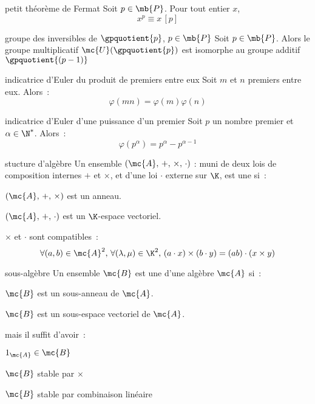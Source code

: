 \begin{adjustwidth}{-3cm}{-3cm}
\begin{theoreme}{2.51}{petit théorème de Fermat}
    Soit $p \in \mb{P}$. Pour tout entier $x$, $$x^p \equiv x \,[p]$$
\end{theoreme}

\begin{theoreme}{2.52}{groupe des inversibles de $\gpquotient{p}$, $p \in \mb{P}$}
    Soit $p \in \mb{P}$. Alors le groupe multiplicatif $\mc{U}(\gpquotient{p})$ est isomorphe au groupe additif $\gpquotient{(p-1)}$
\end{theoreme}

\begin{proposition}{2.54}{indicatrice d'Euler du produit de premiers entre eux}
    Soit $m$ et $n$ premiers entre eux. Alors~:
    $$\varphi(mn) = \varphi(m)\varphi(n)$$
\end{proposition}

\begin{proposition}{2.55}{indicatrice d'Euler d'une puissance d'un premier}
    Soit $p$ un nombre premier et $\alpha \in \N^*$. Alors~:
    $$\varphi(p^\alpha) = p^\alpha - p^{\alpha -1}$$
\end{proposition}

\begin{definition}{2.72}{stucture d'algèbre}
    Un ensemble $(\mc{A},\, +,\, \times,\, \cdot)$ :  muni de deux lois de composition internes $+$ et $\times$, et d’une loi $\cdot$ externe sur $\K$, est une  si~:
    \begin{enumeratebf}
        \item $(\mc{A},\, +,\, \times)$ est un anneau.
        \item $(\mc{A},\, +,\, \cdot)$ est un $\K$-espace vectoriel.
        \item $\times$ et $\cdot$ sont compatibles~:
        $$\forall (a,b) \in \mc{A}^2,\, \forall (\lambda, \mu) \in \K^2,\, (a \cdot x) \times (b \cdot y) = (ab) \cdot (x \times y)$$
    \end{enumeratebf}
\end{definition}

\begin{definition}{2.74}{sous-algèbre}
    Un ensemble $\mc{B}$ est une   d'une algèbre $\mc{A}$ si~:
    \begin{enumeratebf}
        \item $\mc{B}$ est un sous-anneau de $\mc{A}$.
        \item $\mc{B}$ est un sous-espace vectoriel de $\mc{A}$.
    \end{enumeratebf}
    mais il suffit d'avoir~:
    \begin{enumeratebf}
        \item $1_\mc{A} \in \mc{B}$
        \item $\mc{B}$ stable par $\times$
        \item $\mc{B}$ stable par combinaison linéaire
    \end{enumeratebf}
\end{definition}


\end{adjustwidth}
